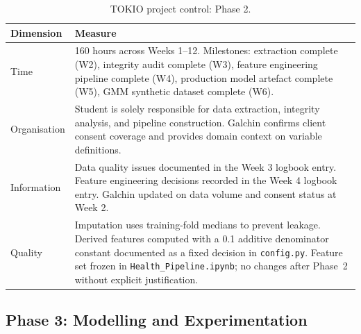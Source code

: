 \documentclass[11pt,a4paper]{article}
\begin{document}
\begin{table}[H]
  \centering
  \caption{TOKIO project control: Phase 2.}
  \label{tab:tokio2}
  \small
  \begin{tabular}{p{2.2cm} p{11cm}}
    \toprule
    \textbf{Dimension} & \textbf{Measure} \\
    \midrule
    Time         & 160 hours across Weeks 1--12. Milestones: extraction complete (W2), integrity audit complete (W3), feature engineering pipeline complete (W4), production model artefact complete (W5), GMM synthetic dataset complete (W6). \\
    Organisation & Student is solely responsible for data extraction, integrity analysis, and pipeline construction. Galchin confirms client consent coverage and provides domain context on variable definitions. \\
    Information  & Data quality issues documented in the Week 3 logbook entry. Feature engineering decisions recorded in the Week 4 logbook entry. Galchin updated on data volume and consent status at Week 2. \\
    Quality      & Imputation uses training-fold medians to prevent leakage. Derived features computed with a 0.1 additive denominator constant documented as a fixed decision in \texttt{config.py}. Feature set frozen in \texttt{Health\_Pipeline.ipynb}; no changes after Phase~2 without explicit justification. \\
    \bottomrule
  \end{tabular}
\end{table}

\subsection{Phase 3: Modelling and Experimentation}
\end{document}
